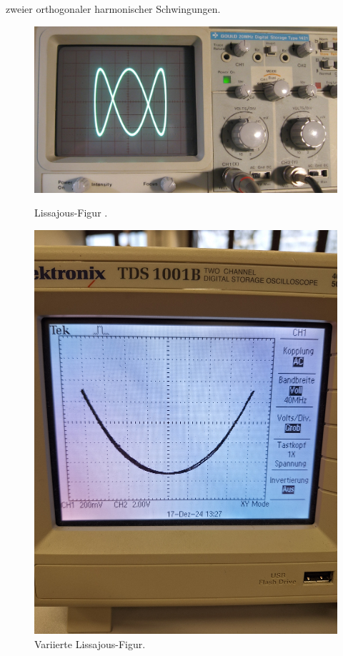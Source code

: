 zweier orthogonaler harmonischer Schwingungen.
\begin{figure}[H]
    \centering
    \begin{minipage}{0.48\textwidth}
        \centering
        \includegraphics[width=\linewidth]{"Bilder/lissajous.jpg"}
        \caption{Lissajous-Figur \cite{lissajous}.}
        \label{fig:2}
    \end{minipage}
    \hfill
    \begin{minipage}{0.48\textwidth}
        \centering
        \includegraphics[width=0.9\linewidth, angle=-90]{"Bilder/la.jpg"}
        \caption{Variierte Lissajous-Figur.}
        \label{fig:3}
    \end{minipage}
\end{figure}
